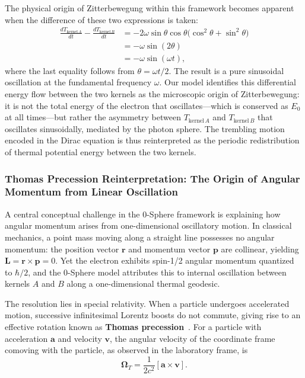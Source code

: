 \documentclass[12pt,letterpaper]{article}
\begin{document}
The physical origin of Zitterbewegung within this framework becomes apparent when the difference of these two expressions is taken:
\begin{align}
  \frac{dT_{\mathrm{kernel}\,A}}{dt} - \frac{dT_{\mathrm{kernel}\,B}}{dt}
  &= -2\omega\sin\theta\cos\theta\bigl(\cos^2\theta + \sin^2\theta\bigr) \\
  &= -\omega\sin(2\theta) \\
  &= -\omega\sin(\omega t),
\end{align}
where the last equality follows from $\theta = \omega t/2$. The result is a pure sinusoidal oscillation at the fundamental frequency $\omega$. Our model identifies this differential energy flow between the two kernels as the microscopic origin of Zitterbewegung: it is not the total energy of the electron that oscillates---which is conserved as $E_0$ at all times---but rather the asymmetry between $T_{\mathrm{kernel}\,A}$ and $T_{\mathrm{kernel}\,B}$ that oscillates sinusoidally, mediated by the photon sphere. The trembling motion encoded in the Dirac equation is thus reinterpreted as the periodic redistribution of thermal potential energy between the two kernels.


\subsubsection{Thomas Precession Reinterpretation: The Origin of Angular Momentum from Linear Oscillation}
\label{subsubsec:thomas_reinterpretation}

A central conceptual challenge in the 0-Sphere framework is explaining how angular momentum arises from one-dimensional oscillatory motion. In classical mechanics, a point mass moving along a straight line possesses no angular momentum: the position vector $\bm{r}$ and momentum vector $\bm{p}$ are collinear, yielding $\bm{L} = \bm{r} \times \bm{p} = 0$. Yet the electron exhibits spin-1/2 angular momentum quantized to $\hbar/2$, and the 0-Sphere model attributes this to internal oscillation between kernels $A$ and $B$ along a one-dimensional thermal geodesic.

The resolution lies in special relativity. When a particle undergoes accelerated motion, successive infinitesimal Lorentz boosts do not commute, giving rise to an effective rotation known as \textbf{Thomas precession}~\cite{hanamura17764997}. For a particle with acceleration $\bm{a}$ and velocity $\bm{v}$, the angular velocity of the coordinate frame comoving with the particle, as observed in the laboratory frame, is
\begin{equation}
\bm{\Omega}_T = \frac{1}{2c^2} [\bm{a} \times \bm{v}].
\label{eq:thomas_precession_general}
\end{equation}
\end{document}
